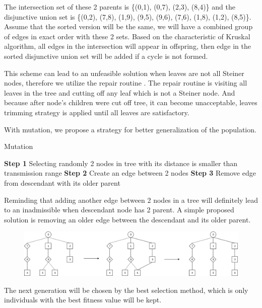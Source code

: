 	The intersection set of these 2 parents is \{(0,1), (0,7), (2,3), (8,4)\} and the disjunctive union set is \{(0,2), (7,8), (1,9), (9,5), (9,6), (7,6), (1,8), (1,2), (8,5)\}. Assume that the sorted version will be the same, we will have a combined group of edges in exact order with these 2 sets. Based on the characteristic of Kruskal algorithm, all edges in the intersection will appear in offspring, then edge in the sorted disjunctive union set will be added if a cycle is not formed.

	This scheme can lead to an unfeasible solution when leaves are not all Steiner nodes, therefore we utilize the repair routine \cite{lu2014construction}. The repair routine is visiting all leaves in the tree and cutting off any leaf which is not a Steiner node. And because after node’s children were cut off tree, it can become unacceptable, leaves trimming strategy is applied until all leaves are satisfactory.

	With mutation, we propose a strategy for better generalization of the population.

\begin{algorithm}
\caption{Mutation}
\begin{algorithmic}[0]
\State \textbf{Step 1} Selecting randomly 2 nodes in tree with its distance is smaller than transmission range
\State \textbf{Step 2} Create an edge between 2 nodes
\State \textbf{Step 3} Remove edge from descendant with its older parent
\end{algorithmic}
\end{algorithm}

	Reminding that adding another edge between 2 nodes in a tree will definitely lead to an inadmissible when descendant node has 2 parent. A simple proposed solution is removing an older edge between the descendant and its older parent.

\noindent{}
\begin{figure}
	\centering
	\includegraphics[scale=0.4]{Images/EdgeSetMutation}
\end{figure}

	The next generation will be chosen by the best selection method, which is only individuals with the best fitness value will be kept.
